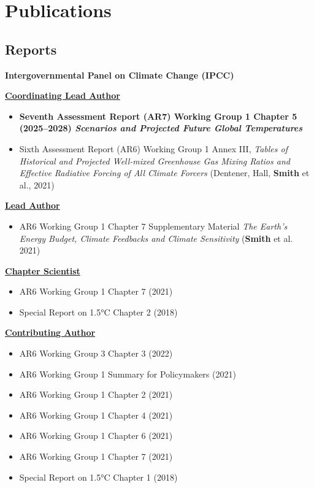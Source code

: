 \documentclass[11pt,a4paper,sans]{moderncv}
\begin{document}
\section{Publications}

\subsection{Reports}

\medskip\noindent\textbf{Intergovernmental Panel on Climate Change (IPCC)}\par\medskip

\textbf{\underline{Coordinating Lead Author}}
\begin{itemize}
\item \textbf{Seventh Assessment Report (AR7) Working Group 1 Chapter 5 (2025--2028) \textit{Scenarios and Projected Future Global Temperatures}}
\item Sixth Assessment Report (AR6) Working Group 1 Annex III, \textit{Tables of Historical and Projected Well-mixed Greenhouse Gas Mixing Ratios and Effective Radiative Forcing of All Climate Forcers} (Dentener, Hall, \textbf{Smith} et al., 2021)
\end{itemize}

\textbf{\underline{Lead Author}}
\begin{itemize}
\item AR6 Working Group 1 Chapter 7 Supplementary Material \textit{The Earth's Energy Budget, Climate Feedbacks and Climate Sensitivity} (\textbf{Smith} et al. 2021)
\end{itemize}

\textbf{\underline{Chapter Scientist}}
\begin{itemize}
\item AR6 Working Group 1 Chapter 7 (2021)
\item Special Report on 1.5°C Chapter 2 (2018)
\end{itemize}

\textbf{\underline{Contributing Author}}
\begin{itemize}
\item AR6 Working Group 3 Chapter 3 (2022)
\item AR6 Working Group 1 Summary for Policymakers (2021)
\item AR6 Working Group 1 Chapter 2 (2021)
\item AR6 Working Group 1 Chapter 4 (2021)
\item AR6 Working Group 1 Chapter 6 (2021)
\item AR6 Working Group 1 Chapter 7 (2021)
\item Special Report on 1.5°C Chapter 1 (2018)
\end{itemize}
\end{document}
